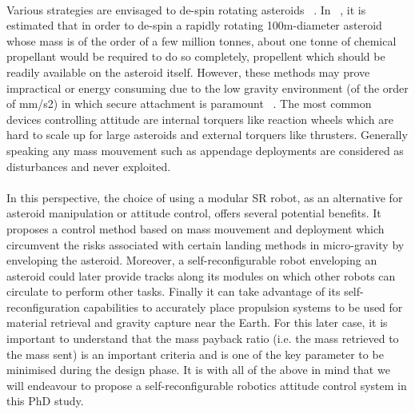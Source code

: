 \paragraph{}	Various strategies are envisaged to de-spin rotating asteroids ~\cite{Sommariva2015,LewisBook}. In ~\cite{LewisBook}, it is estimated that in order to de-spin a rapidly rotating 100m-diameter asteroid whose mass is of the order of a few million tonnes, about one tonne of chemical propellant would be required to do so completely, propellent which should be readily available on the asteroid itself. However, these methods may prove impractical or energy consuming due to the low gravity environment (of the order of mm/s2) in which secure attachment is paramount ~\cite{LewisBook}.
The most common devices controlling attitude are internal torquers like reaction wheels which are hard to scale up for large asteroids and external torquers like thrusters. Generally speaking any mass mouvement such as appendage deployments are considered as disturbances and never exploited.
\paragraph{}In this perspective, the choice of using a modular SR robot, as an alternative for asteroid manipulation or attitude control, offers several potential benefits. It proposes a control method based on mass mouvement and deployment which circumvent the risks associated with certain landing methods in micro-gravity by enveloping the asteroid. Moreover, a self-reconfigurable robot enveloping an asteroid could later provide tracks along its modules on which other robots can circulate to perform other tasks. Finally it can take advantage of its self-reconfiguration capabilities to accurately place propulsion systems to be used for material retrieval and gravity capture near the Earth. For this later case, it is important to understand that the mass payback ratio (i.e. the mass retrieved to the mass sent) is an important criteria and is one of the key parameter to be minimised during the design phase. It is with all of the above in mind that we will endeavour to propose a self-reconfigurable robotics attitude control system in this PhD study.

